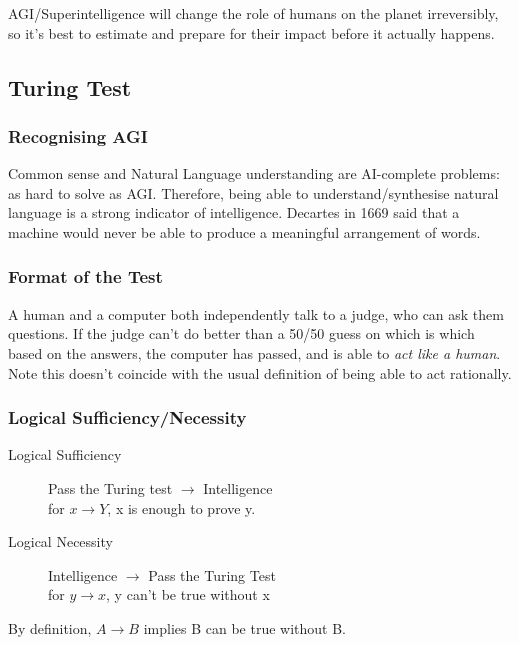AGI/Superintelligence will change the role of humans on the planet irreversibly, so it's best to estimate and prepare for their impact before it actually happens. 

\subsection{Turing Test}

\subsubsection{Recognising AGI}
Common sense and Natural Language understanding are AI-complete problems: as hard to solve as AGI. Therefore, being able to understand/synthesise natural language is a strong indicator of intelligence. Decartes in 1669 said that a machine would never be able to produce a meaningful arrangement of words.

\subsubsection{Format of the Test}
A human and a computer both independently talk to a judge, who can ask them questions. If the judge can't do better than a 50/50 guess on which is which based on the answers, the computer has passed, and is able to \emph{act like a human}.\\

Note this doesn't coincide with the usual definition of being able to act rationally. 

\subsubsection{Logical Sufficiency/Necessity}
\begin{description}
    \item[Logical Sufficiency] Pass the Turing test $\rightarrow$ Intelligence \\ \quad for $x\rightarrow Y$, x is enough to prove y. 
    \item[Logical Necessity] Intelligence $\rightarrow$ Pass the Turing Test \\ \quad for $y\rightarrow x$, y can't be true without x
\end{description}
By definition, $A\rightarrow B$ implies B can be true without B.

